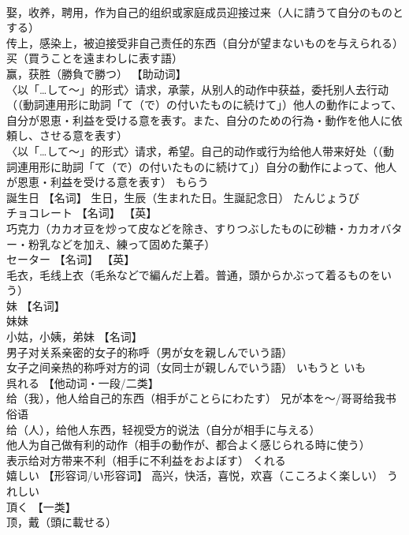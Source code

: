 \documentclass[8pt]{extreport}
\begin{document}
\begin{CJK}{UTF8}{min}
\\	娶，收养，聘用，作为自己的组织或家庭成员迎接过来（人に請うて自分のものとする） 
\\	传上，感染上，被迫接受非自己责任的东西（自分が望まないものを与えられる） 
\\	买（買うことを遠まわしに表す語） 
\\	赢，获胜（勝負で勝つ） 【助动词】 
\\	〈以「…して～」的形式〉请求，承蒙，从别人的动作中获益，委托别人去行动（（動詞連用形に助詞「て（で）の付いたものに続けて」）他人の動作によって、自分が恩恵・利益を受ける意を表す。また、自分のための行為・動作を他人に依頼し、させる意を表す） 
\\	〈以「…して～」的形式〉请求，希望。自己的动作或行为给他人带来好处（（動詞連用形に助詞「て（で）の付いたものに続けて」）自分の動作によって、他人が恩恵・利益を受ける意を表す）	もらう	
\\	誕生日	【名词】 生日，生辰（生まれた日。生誕記念日）	たんじょうび	
\\	チョコレート	【名词】 【英】
\\	巧克力（カカオ豆を炒って皮などを除き、すりつぶしたものに砂糖・カカオバター・粉乳などを加え、練って固めた菓子）		
\\	セーター	【名词】 【英】
\\	毛衣，毛线上衣（毛糸などで編んだ上着。普通，頭からかぶって着るものをいう）		
\\	妹	【名词】 
\\	妹妹 
\\	小姑，小姨，弟妹 【名词】 
\\	男子对关系亲密的女子的称呼（男が女を親しんでいう語） 
\\	女子之间亲热的称呼对方的词（女同士が親しんでいう語）	いもうと いも	
\\	呉れる	【他动词・一段/二类】 
\\	给（我），他人给自己的东西（相手がことらにわたす） 兄が本を～/哥哥给我书 
\\	俗语
\\	给（人），给他人东西，轻视受方的说法（自分が相手に与える） 
\\	他人为自己做有利的动作（相手の動作が、都合よく感じられる時に使う） 
\\	表示给对方带来不利（相手に不利益をおよぼす）	くれる	
\\	嬉しい	【形容词/い形容词】 高兴，快活，喜悦，欢喜（こころよく楽しい）	うれしい	
\\	頂く	【一类】 
\\	顶，戴（頭に載せる） 

\end{CJK}
\end{document}
